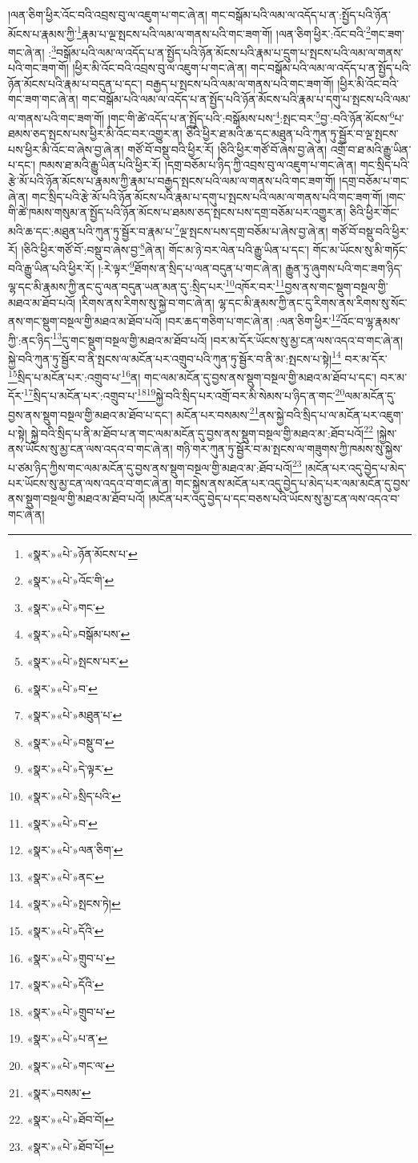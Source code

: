 །ལན་ཅིག་ཕྱིར་འོང་བའི་འབྲས་བུ་ལ་འཇུག་པ་གང་ཞེ་ན། གང་བསྒོམ་པའི་ལམ་ལ་འདོད་པ་ན་:སྤྱོད་པའི་ཉོན་མོངས་པ་རྣམས་ཀྱི་\footnote{«སྣར་»«པེ་»ཉོན་མོངས་པ་}རྣམ་པ་ལྔ་སྤངས་པའི་ལམ་ལ་གནས་པའི་གང་ཟག་གོ། །ལན་ཅིག་ཕྱིར་:འོང་བའི་\footnote{«སྣར་»«པེ་»འོང་གི་}གང་ཟག་གང་ཞེ་ན། :\footnote{«སྣར་»«པེ་»གང་}བསྒོམ་པའི་ལམ་ལ་འདོད་པ་ན་སྤྱོད་པའི་ཉོན་མོངས་པའི་རྣམ་པ་དྲུག་པ་སྤངས་པའི་ལམ་ལ་གནས་པའི་གང་ཟག་གོ། །ཕྱིར་མི་འོང་བའི་འབྲས་བུ་ལ་འཇུག་པ་གང་ཞེ་ན། གང་བསྒོམ་པའི་ལམ་ལ་འདོད་པ་ན་སྤྱོད་པའི་ཉོན་མོངས་པའི་རྣམ་པ་བདུན་པ་དང་། བརྒྱད་པ་སྤངས་པའི་ལམ་ལ་གནས་པའི་གང་ཟག་གོ། །ཕྱིར་མི་འོང་བའི་གང་ཟག་གང་ཞེ་ན། གང་བསྒོམ་པའི་ལམ་ལ་འདོད་པ་ན་སྤྱོད་པའི་ཉོན་མོངས་པའི་རྣམ་པ་དགུ་པ་སྤངས་པའི་ལམ་ལ་གནས་པའི་གང་ཟག་གོ། །གང་གི་ཚེ་འདོད་པ་ན་སྤྱོད་པའི་:བསྒོམས་པས་\footnote{«སྣར་»«པེ་»བསྒོམ་པས་}:སྤང་བར་\footnote{«སྣར་»«པེ་»སྤངས་པར་}བྱ་:བའི་ཉོན་མོངས་\footnote{«སྣར་»«པེ་»བ་}པ་ཐམས་ཅད་སྤངས་པས་ཕྱིར་མི་འོང་བར་འགྱུར་ན། ཅིའི་ཕྱིར་ཐ་མའི་ཆ་དང་མཐུན་པའི་ཀུན་ཏུ་སྦྱོར་བ་ལྔ་སྤངས་པས་ཕྱིར་མི་འོང་བ་ཞེས་བྱ་ཞེ་ན། གཙོ་བོ་བསྡུ་བའི་ཕྱིར་རོ། །ཅིའི་ཕྱིར་གཙོ་བོ་ཞེས་བྱ་ཞེ་ན། འགྲོ་བ་ཐ་མའི་རྒྱུ་ཡིན་པ་དང་། ཁམས་ཐ་མའི་རྒྱུ་ཡིན་པའི་ཕྱིར་རོ། །དགྲ་བཅོམ་པ་ཉིད་ཀྱི་འབྲས་བུ་ལ་འཇུག་པ་གང་ཞེ་ན། གང་སྲིད་པའི་རྩེ་མོ་པའི་ཉོན་མོངས་པ་རྣམས་ཀྱི་རྣམ་པ་བརྒྱད་སྤངས་པའི་ལམ་ལ་གནས་པའི་གང་ཟག་གོ། །དགྲ་བཅོམ་པ་གང་ཞེ་ན། གང་སྲིད་པའི་རྩེ་མོ་པའི་ཉོན་མོངས་པའི་རྣམ་པ་དགུ་པ་སྤངས་པའི་ལམ་ལ་གནས་པའི་གང་ཟག་གོ། །གང་གི་ཚེ་ཁམས་གསུམ་ན་སྤྱོད་པའི་ཉོན་མོངས་པ་ཐམས་ཅད་སྤངས་པས་དགྲ་བཅོམ་པར་འགྱུར་ན། ཅིའི་ཕྱིར་གོང་མའི་ཆ་དང་:མཐུན་པའི་ཀུན་ཏུ་སྦྱོར་བ་རྣམ་པ་\footnote{«སྣར་»«པེ་»མཐུན་པ་}ལྔ་སྤངས་པས་དགྲ་བཅོམ་པ་ཞེས་བྱ་ཞེ་ན། གཙོ་བོ་བསྡུ་བའི་ཕྱིར་རོ། །ཅིའི་ཕྱིར་གཙོ་བོ་:བསྡུ་བ་ཞེས་བྱ་\footnote{«སྣར་»«པེ་»བསྡུ་བ་}ཞེ་ན། གོང་མ་ཉེ་བར་ལེན་པའི་རྒྱུ་ཡིན་པ་དང་། གོང་མ་ཡོངས་སུ་མི་གཏོང་བའི་རྒྱུ་ཡིན་པའི་ཕྱིར་རོ། །:རེ་ལྟར་\footnote{«སྣར་»«པེ་»དེ་ལྟར་}ཐོགས་ན་སྲིད་པ་ལན་བདུན་པ་གང་ཞེ་ན། རྒྱུན་ཏུ་ཞུགས་པའི་གང་ཟག་ཉིད་ལྷ་དང་མི་རྣམས་ཀྱི་ནང་དུ་ལན་བདུན་ཡན་མན་དུ་:སྲིད་པར་\footnote{«སྣར་»«པེ་»སྲིད་པའི་}འཁོར་བར་\footnote{«སྣར་»«པེ་»བ་}བྱས་ནས་གང་སྡུག་བསྔལ་གྱི་མཐའ་མ་ཐོབ་པའོ། །རིགས་ནས་རིགས་སུ་སྐྱེ་བ་གང་ཞེ་ན། ལྷ་དང་མི་རྣམས་ཀྱི་ནང་དུ་རིགས་ནས་རིགས་སུ་སོང་ནས་གང་སྡུག་བསྔལ་གྱི་མཐའ་མ་ཐོབ་པའོ། །བར་ཆད་གཅིག་པ་གང་ཞེ་ན། :ལན་ཅིག་ཕྱིར་\footnote{«སྣར་»«པེ་»ལན་ཅིག་}འོང་བ་ལྷ་རྣམས་ཀྱི་:ནང་ཉིད་\footnote{«སྣར་»«པེ་»ནང་}དུ་གང་སྡུག་བསྔལ་གྱི་མཐའ་མ་ཐོབ་པའོ། །བར་མ་དོར་ཡོངས་སུ་མྱ་ངན་ལས་འདའ་བ་གང་ཞེ་ན། སྐྱེ་བའི་ཀུན་ཏུ་སྦྱོར་བ་ནི་སྤངས་ལ་མངོན་པར་འགྲུབ་པའི་ཀུན་ཏུ་སྦྱོར་བ་ནི་མ་:སྤངས་པ་སྟེ།\footnote{«སྣར་»«པེ་»སྤངས་ཏེ།} བར་མ་དོར་\footnote{«སྣར་»«པེ་»དོའི་}སྲིད་པ་མངོན་པར་:འགྲུབ་པ་\footnote{«སྣར་»«པེ་»གྲུབ་པ་}ན། གང་ལམ་མངོན་དུ་བྱས་ནས་སྡུག་བསྔལ་གྱི་མཐའ་མ་ཐོབ་པ་དང་། བར་མ་དོར་\footnote{«སྣར་»«པེ་»དོའི་}སྲིད་པ་མངོན་པར་:འགྲུབ་པ་\footnote{«སྣར་»«པེ་»གྲུབ་པ་}\footnote{«སྣར་»«པེ་»པ་ན་}སྐྱེ་བའི་སྲིད་པར་འགྲོ་བར་མི་སེམས་པ་ཉིད་ན་གང་\footnote{«སྣར་»«པེ་»གང་ལ་}ལམ་མངོན་དུ་བྱས་ནས་སྡུག་བསྔལ་གྱི་མཐའ་མ་ཐོབ་པ་དང་། མངོན་པར་བསམས་\footnote{«སྣར་»བསམ་}ནས་སྐྱེ་བའི་སྲིད་པ་ལ་མངོན་པར་འཇུག་པ་སྟེ། སྐྱེ་བའི་སྲིད་པ་ནི་མ་ཐོབ་པ་ན་གང་ལམ་མངོན་དུ་བྱས་ནས་སྡུག་བསྔལ་གྱི་མཐའ་མ་:ཐོབ་པའོ།\footnote{«སྣར་»«པེ་»ཐོབ་བོ།} །སྐྱེས་ནས་ཡོངས་སུ་མྱ་ངན་ལས་འདའ་བ་གང་ཞེ་ན། གཉི་གར་ཀུན་ཏུ་སྦྱོར་བ་མ་སྤངས་ལ་གཟུགས་ཀྱི་ཁམས་སུ་སྐྱེས་པ་ཙམ་ཉིད་ཀྱིས་གང་ལམ་མངོན་དུ་བྱས་ནས་སྡུག་བསྔལ་གྱི་མཐའ་མ་:ཐོབ་པའོ།\footnote{«སྣར་»«པེ་»ཐོབ་པོ།} །མངོན་པར་འདུ་བྱེད་པ་མེད་པར་ཡོངས་སུ་མྱ་ངན་ལས་འདའ་བ་གང་ཞེ་ན། གང་སྐྱེས་ནས་མངོན་པར་འདུ་བྱེད་པ་མེད་པར་ལམ་མངོན་དུ་བྱས་ནས་སྡུག་བསྔལ་གྱི་མཐའ་མ་ཐོབ་པའོ། །མངོན་པར་འདུ་བྱེད་པ་དང་བཅས་པའི་ཡོངས་སུ་མྱ་ངན་ལས་འདའ་བ་གང་ཞེ་ན། 